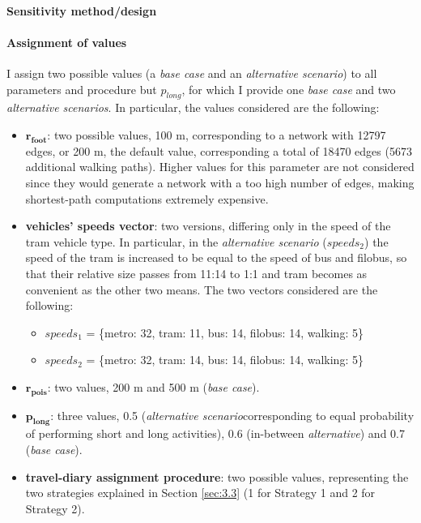 \paragraph{Sensitivity method/design}


\paragraph{Assignment of values}
I assign two possible values (a \textit{base case} and an \textit{alternative scenario}) to all parameters and procedure but $p_{long}$, for which I provide one \textit{base case} and two \textit{alternative scenarios}. In particular, the values considered are the following:
\begin{itemize}
    \item $\mathbf{r_{foot}}$: two possible values, 100 m, corresponding to a network with 12797 edges, or 200 m, the default value, corresponding a total of 18470 edges (5673 additional walking paths). Higher values for this parameter are not considered since they would generate a network with a too high number of edges, making shortest-path computations extremely expensive.
    \item \textbf{vehicles' speeds vector}: two versions, differing only in the speed of the tram vehicle type. In particular, in the \textit{alternative scenario} ($speeds_2$) the speed of the tram is increased to be equal to the speed of bus and filobus, so that their relative size passes from 11:14 to 1:1 and tram becomes as convenient as the other two means. The two vectors considered are the following:
            \begin{itemize}
                \item $speeds_1$ = \{metro: 32, tram: 11, bus: 14, filobus: 14, walking: 5\}
                \item $speeds_2$ = \{metro: 32, tram: 14, bus: 14, filobus: 14, walking: 5\}
            \end{itemize}
    \item $\mathbf{r_{pois}}$: two values, 200 m and 500 m (\textit{base case}). 
    \item $\mathbf{p_{long}}$: three values, 0.5 (\textit{alternative scenario}corresponding to equal probability of performing short and long activities), 0.6 (in-between \textit{alternative}) and 0.7 (\textit{base case}).
    \item \textbf{travel-diary assignment procedure}: two possible values, representing the two strategies explained in Section \ref{sec:3.3} (1 for Strategy 1 and 2 for Strategy 2).
\end{itemize}

